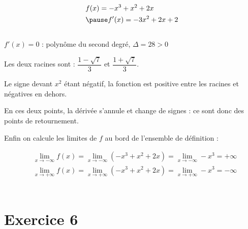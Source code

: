 \documentclass[9pt,handout,professionalfonts,hyperref]{beamer}
\begin{document}
\begin{frame}

\[\begin{aligned}
&f(x)=-x^3+x^2+2x\\
&\pause f'(x)=-3x^2+2x+2
\end{aligned}\]\\

\pause \medskip 
$f'(x)=0$ : polynôme du second degré, \pause $\Delta=28>0$ \newline 

\pause Les deux racines sont : $\dfrac{1-\sqrt{7}}{3}$ et  $\dfrac{1+\sqrt{7}}{3}$.\newline 

\pause Le signe devant $x^2$ étant négatif, \pause la fonction est positive entre les racines et négatives en dehors.\newline 

\pause En ces deux points, la dérivée s'annule et change de signes : ce sont donc des points de retournement.\newline 

\pause Enfin on calcule les limites de $f$ au bord de l'ensemble de définition :

\[\begin{aligned}
&\lim_{x \to -\infty} f(x)=\lim_{x \to -\infty} (-x^3+x^2+2x) =\lim_{x \to -\infty} -x^3 = +\infty \\
&\lim_{x \to +\infty} f(x)=\lim_{x \to +\infty} (-x^3+x^2+2x) =\lim_{x \to +\infty} -x^3 = -\infty 
\end{aligned}\]\\


\end{frame}

\begin{frame}
\begin{adjustbox}{width=\textwidth,center}
\end{adjustbox}


\end{frame}

\section{Exercice 6}
\end{document}
